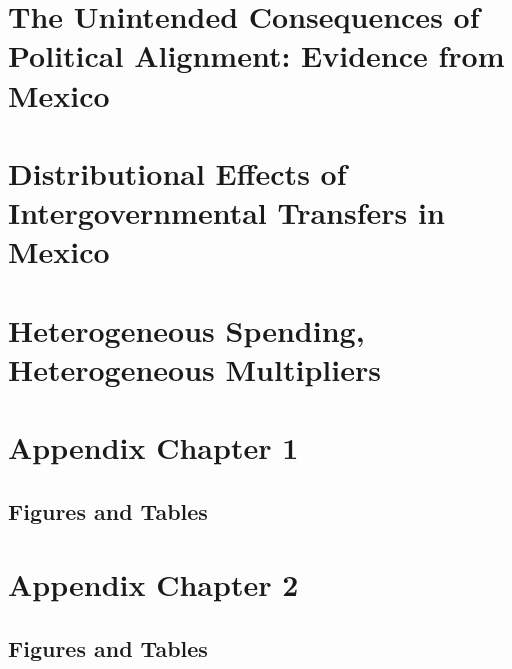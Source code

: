 \documentclass[12pt]{report}
\begin{document}
\chapter{The Unintended Consequences of Political Alignment: Evidence from Mexico}\label{chap:c1}


\label{sec:context}
\label{sec:identification}
\label{sec:data}
\label{sec:validity}
\label{sec:results}

\label{sec:channels}
\label{sec:channels}
\label{sec:channels}


\chapter{Distributional Effects of Intergovernmental Transfers in Mexico}\label{chap:c2}



\chapter{Heterogeneous Spending, Heterogeneous Multipliers}\label{chap:c3}



\appendixtocoff
\appendices

\chapter{Appendix Chapter 1}
\newpage
\section{Figures and Tables}
\label{FirstAppendixC1}
\newpage
\label{SecondAppendixC1}

\newpage
\chapter{Appendix Chapter 2}
\section{Figures and Tables}
\label{FirstAppendixC2}
\newpage
\label{SecondAppendixC2}
\newpage
\end{document}
